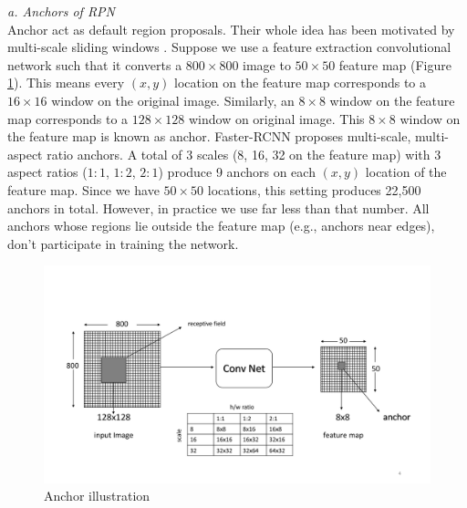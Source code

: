 \vspace{5pt}
\textit{a. Anchors of RPN}\\
Anchor act as default region proposals. Their whole idea has been motivated by multi-scale sliding windows \cite{ref_fasterrcnn}. Suppose we use a feature extraction convolutional network such that it converts a $800\times800$ image to $50\times50$ feature map (Figure \ref{fig:anchors}). This means every $(x,y)$ location on the feature map corresponds to a $16\times16$ window on the original image. Similarly, an $8\times8$ window on the feature map corresponds to a $128\times128$ window on original image. This $8\times8$ window on the feature map is known as anchor. Faster-RCNN proposes multi-scale, multi-aspect ratio anchors. A total of 3 scales (8, 16, 32 on the feature map) with 3 aspect ratios ($1:1$, $1:2$, $2:1$) produce 9 anchors on each $(x,y)$ location of the feature map. Since we have $50\times50$ locations, this setting produces 22,500 anchors in total. However, in practice we use far less than that number. All anchors whose regions lie outside the feature map (e.g., anchors near edges), don't participate in training the network. 

\begin{figure}
    \centering
    \includegraphics[width=\linewidth,trim={0 60 0 130},clip]{images/anchors}
    \caption[Anchor illustration]{Anchor illustration}
    \label{fig:anchors}
\end{figure}

